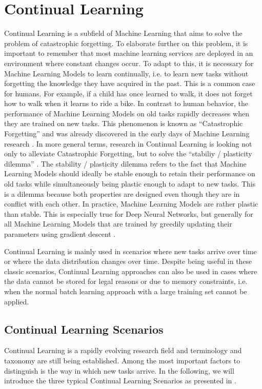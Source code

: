 \section{Continual Learning}
\label{sec:ContinualLearning}
Continual Learning is a subfield of Machine Learning that aims to solve the problem of catastrophic forgetting. To elaborate further on this problem,
it is important to remember that most machine learning services are deployed in an environment where constant changes occur. To adapt to this, it is
necessary for Machine Learning Models to learn continually, i.e. to learn new tasks without forgetting the knowledge they have acquired in the past.
This is a common case for humans. For example, if a child has once learned to walk, it does not forget how to walk when it learns to ride a bike.
In contrast to human behavior, the performance of Machine Learning Models on old tasks rapidly decreases when they are trained on new tasks. This phenomenon
is known as \enquote{Catastrophic Forgetting} and was already discovered in the early days of Machine Learning research \cite{mccloskey1989catastrophic}.
In more general terms, research in Continual Learning is looking not only to alleviate Catastrophic Forgetting, but to solve the 
\enquote{stabiliy / plasticity dilemma} \cite{carpenter1988art}. The stability / plasticity dilemma refers to the fact that Machine Learning Models
should ideally be stable enough to retain their performance on old tasks while simultaneously being plastic enough to adapt to new tasks. This is a dilemma
because both properties are designed even though they are in conflict with each other. In practice, Machine Learning Models are rather plastic than stable.
This is especially true for Deep Neural Networks, but generally for all Machine Learning Models that are trained by greedily updating their parameters using
gradient descent \cite{mundt2020wholistic}. \par
Continual Learning is mainly used in scenarios where new tasks arrive over time or where the data distribution changes over time. Despite being useful
in these classic scenarios, Continual Learning approaches can also be used in cases where the data cannot be stored for legal reasons or due to memory
constraints, i.e. when the normal batch learning approach with a large training set cannot be applied. 


\subsection{Continual Learning Scenarios}
\label{sec:ContinualLearningScenarios}
Continual Learning is a rapidly evolving research field and terminology and taxonomy are still being established. Among the most important factors to distinguish
is the way in which new tasks arrive. In the following, we will introduce the three typical Continual Learning Scenarios as presented in \cite{van2022three}. 

